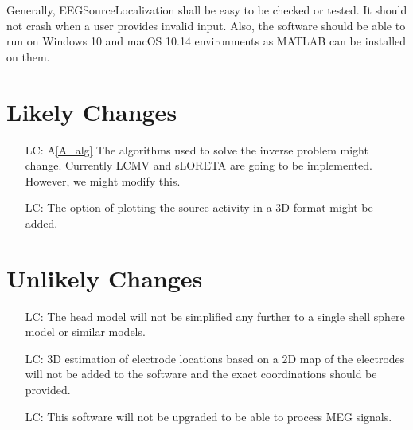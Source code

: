 \documentclass[12pt]{article}
\newcommand{\aref}[1]{A\ref{#1}}
\newcounter{lcnum} %
\renewcommand{\progname}{EEGSourceLocalization}
\begin{document}


Generally,  \progname{} shall be easy to be checked or tested. It should not crash when a user provides invalid input. Also, the software should  be able to run on Windows 10 and macOS 10.14 environments as MATLAB can be installed on them.\\


\section{Likely Changes}    

\noindent \begin{itemize}

\item[LC\refstepcounter{lcnum}\thelcnum\label{LC_alg}:] \aref{A_alg} The algorithms used to solve the inverse problem might change. Currently LCMV and sLORETA are going to be implemented. However, we might modify this.

\item[LC\refstepcounter{lcnum}\thelcnum\label{LC_HM}:] The option of plotting the source activity in a 3D format might be added.


\end{itemize}

\section{Unlikely Changes}    

\noindent \begin{itemize}

\item[LC\refstepcounter{lcnum}\thelcnum\label{LC_meaningfulLabel}:] The head model will not be simplified any further to a single shell sphere model or similar models.

\item[LC\refstepcounter{lcnum}\thelcnum\label{LC_meaningfulLabel}:] 3D estimation of electrode locations based on a 2D map of the electrodes will not be added to the software and the exact coordinations should be provided.

\item[LC\refstepcounter{lcnum}\thelcnum\label{LC_meaningfulLabel}:] This software will not be upgraded to be able to process MEG signals.


\end{itemize}
\end{document}
